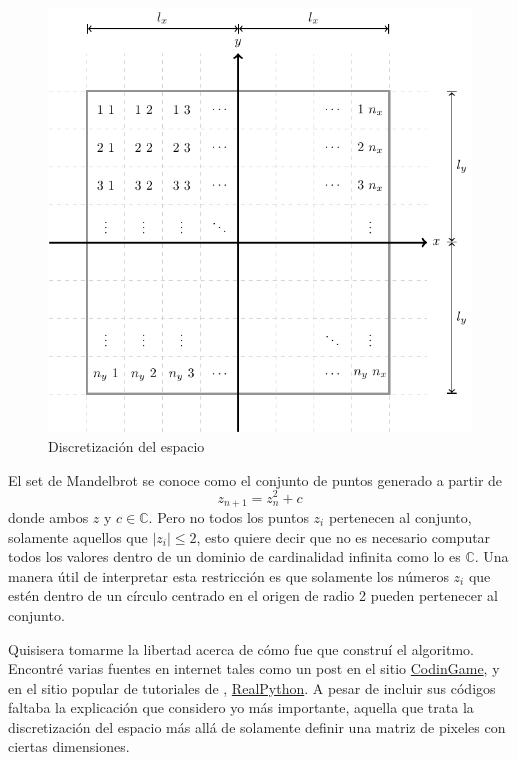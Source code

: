 \begin{figure}[ht!]
    \centering
    \includegraphics[scale=0.8]{../figures/grid/grid}
    \caption{Discretización del espacio}
    \label{fig:grid}
\end{figure}

El set de Mandelbrot se conoce como el conjunto de puntos generado a partir de 
\begin{equation*}
    z_{n+1} = z_{n}^2 + c
\end{equation*}
donde ambos $z$ y $c \in \mathbb{C}$. Pero no todos los puntos $z_i$ pertenecen al conjunto, solamente aquellos que $|z_i| \leq 2$, esto quiere decir que no es necesario computar todos los valores dentro de un dominio de cardinalidad infinita como lo es $\mathbb{C}$. Una manera útil de interpretar esta restricción es que solamente los números $z_i$ que estén dentro de un círculo centrado en el origen de radio 2 pueden pertenecer al conjunto.

Quisisera tomarme la libertad acerca de cómo fue que construí el algoritmo. Encontré varias fuentes en internet tales como un post en el sitio \href{https://www.codingame.com/playgrounds/2358/how-to-plot-the-mandelbrot-set/mandelbrot-set}{CodinGame}, y en el sitio popular de tutoriales de , \href{https://realpython.com/mandelbrot-set-python/#making-an-artistic-representation-of-the-mandelbrot-set}{RealPython}. A pesar de incluir sus códigos faltaba la explicación que considero yo más importante, aquella que trata la discretización del espacio más allá de solamente definir una matriz de pixeles con ciertas dimensiones.

